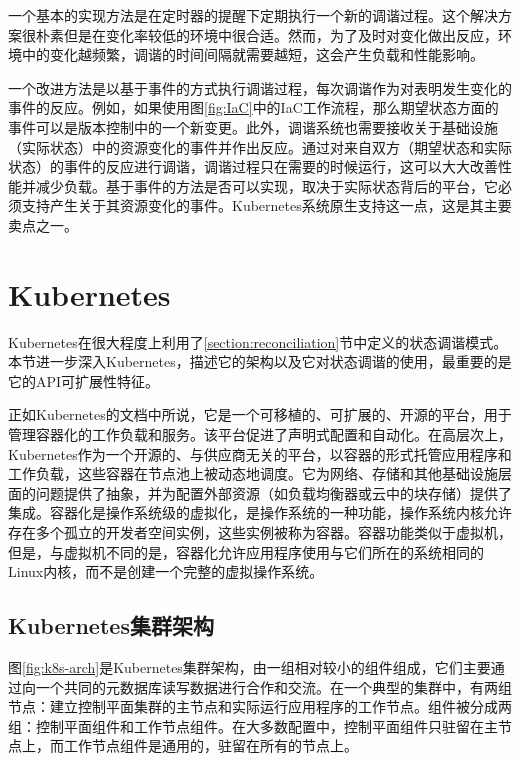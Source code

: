 \documentclass[macfonts,master]{njuthesis}
\begin{document}
一个基本的实现方法是在定时器的提醒下定期执行一个新的调谐过程。这个解决方案很朴素但是在变化率较低的环境中很合适。然而，为了及时对变化做出反应，环境中的变化越频繁，调谐的时间间隔就需要越短，这会产生负载和性能影响。

一个改进方法是以基于事件的方式执行调谐过程，每次调谐作为对表明发生变化的事件的反应。例如，如果使用图\ref{fig:IaC}中的IaC工作流程，那么期望状态方面的事件可以是版本控制中的一个新变更。此外，调谐系统也需要接收关于基础设施（实际状态）中的资源变化的事件并作出反应。通过对来自双方（期望状态和实际状态）的事件的反应进行调谐，调谐过程只在需要的时候运行，这可以大大改善性能并减少负载。基于事件的方法是否可以实现，取决于实际状态背后的平台，它必须支持产生关于其资源变化的事件。Kubernetes系统原生支持这一点，这是其主要卖点之一。

\section{Kubernetes}

Kubernetes在很大程度上利用了\ref{section:reconciliation}节中定义的状态调谐模式。本节进一步深入Kubernetes，描述它的架构以及它对状态调谐的使用，最重要的是它的API可扩展性特征。

正如Kubernetes的文档中所说，它是一个可移植的、可扩展的、开源的平台，用于管理容器化的工作负载和服务。该平台促进了声明式配置和自动化\cite{whatisk8s}。在高层次上，Kubernetes作为一个开源的、与供应商无关的平台，以容器的形式托管应用程序和工作负载，这些容器在节点池上被动态地调度。它为网络、存储和其他基础设施层面的问题提供了抽象，并为配置外部资源（如负载均衡器或云中的块存储）提供了集成。容器化是操作系统级的虚拟化，是操作系统的一种功能，操作系统内核允许存在多个孤立的开发者空间实例，这些实例被称为容器。容器功能类似于虚拟机，但是，与虚拟机不同的是，容器化允许应用程序使用与它们所在的系统相同的Linux内核，而不是创建一个完整的虚拟操作系统。

\subsection{Kubernetes集群架构}

图\ref{fig:k8s-arch}是Kubernetes集群架构，由一组相对较小的组件组成，它们主要通过向一个共同的元数据库读写数据进行合作和交流。在一个典型的集群中，有两组节点：建立控制平面集群的主节点和实际运行应用程序的工作节点。组件被分成两组：控制平面组件和工作节点组件。在大多数配置中，控制平面组件只驻留在主节点上，而工作节点组件是通用的，驻留在所有的节点上\cite{k8scomponents}。
\end{document}
